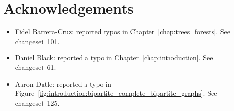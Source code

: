
\chapter{Acknowledgements}

\begin{itemize}
\item Fidel Barrera-Cruz: reported typos in
  Chapter~\ref{chap:trees_forests}. See changeset~101.

\item Daniel Black: reported a typo in
  Chapter~\ref{chap:introduction}. See changeset~61.

\item Aaron Dutle: reported a typo in
  Figure~\ref{fig:introduction:bipartite_complete_bipartite_graphs}. See
  changeset~125.
\end{itemize}
